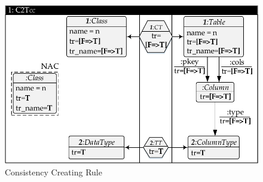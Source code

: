 \begin{figure}[!tb]
\begin{center}
\includegraphics[width=.75\textwidth]{img/gen_intro/cc.pdf}
\end{center}
\caption{Consistency Creating Rule}
\label{fig:sec-msynch-tgg:cc_rule}
\end{figure}


